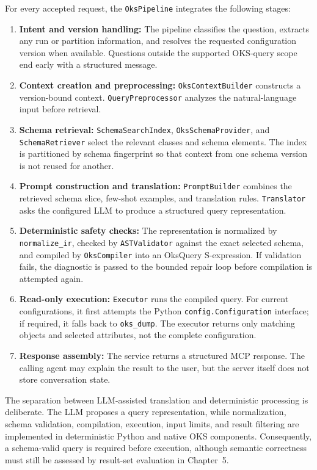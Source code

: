 \documentclass[12pt, a4paper]{report}
\begin{document}
For every accepted request, the \texttt{OksPipeline} integrates the following stages:
\begin{enumerate}[label=\arabic*., leftmargin=1cm]
  \item \textbf{Intent and version handling:} The pipeline classifies the question, extracts any run or partition information, and resolves the requested configuration version when available. Questions outside the supported OKS-query scope end early with a structured message.
  \item \textbf{Context creation and preprocessing:} \texttt{OksContextBuilder} constructs a version-bound context. \texttt{QueryPreprocessor} analyzes the natural-language input before retrieval.
  \item \textbf{Schema retrieval:} \texttt{SchemaSearchIndex}, \texttt{OksSchemaProvider}, and \texttt{SchemaRetriever} select the relevant classes and schema elements. The index is partitioned by schema fingerprint so that context from one schema version is not reused for another.
  \item \textbf{Prompt construction and translation:} \texttt{PromptBuilder} combines the retrieved schema slice, few-shot examples, and translation rules. \texttt{Translator} asks the configured LLM to produce a structured query representation.
  \item \textbf{Deterministic safety checks:} The representation is normalized by \texttt{normalize\_ir}, checked by \texttt{ASTValidator} against the exact selected schema, and compiled by \texttt{OksCompiler} into an OksQuery S-expression. If validation fails, the diagnostic is passed to the bounded repair loop before compilation is attempted again.
  \item \textbf{Read-only execution:} \texttt{Executor} runs the compiled query. For current configurations, it first attempts the Python \texttt{config.Configuration} interface; if required, it falls back to \texttt{oks\_dump}. The executor returns only matching objects and selected attributes, not the complete configuration.
  \item \textbf{Response assembly:} The service returns a structured MCP response. The calling agent may explain the result to the user, but the server itself does not store conversation state.
\end{enumerate}

The separation between LLM-assisted translation and deterministic processing is deliberate. The LLM proposes a query representation, while normalization, schema validation, compilation, execution, input limits, and result filtering are implemented in deterministic Python and native OKS components. Consequently, a schema-valid query is required before execution, although semantic correctness must still be assessed by result-set evaluation in Chapter~5.
\end{document}

